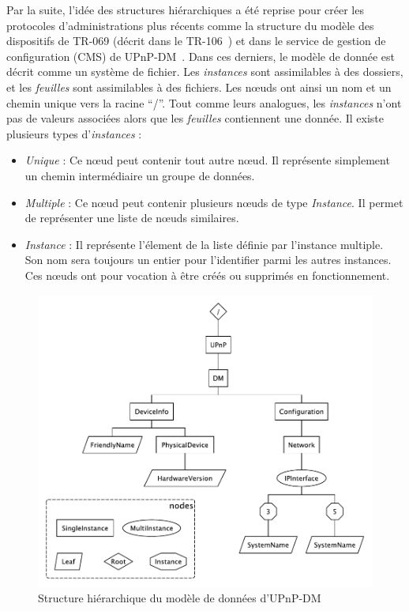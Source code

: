 Par la suite, l'idée des structures hiérarchiques a été reprise pour créer les protocoles d'administrations plus récents comme la structure du modèle des dispositifs de TR-069 (décrit dans le TR-106~\cite{BBF:tr106}) et dans le service de gestion de configuration (CMS) de UPnP-DM~\cite{UPnP:DMCMS}. Dans ces derniers, le modèle de donnée est décrit comme un système de fichier. Les \textit{instances} sont assimilables à des dossiers, et les \textit{feuilles} sont assimilables à des fichiers. Les nœuds ont ainsi un nom et un chemin unique vers la racine \enquote{/}. Tout comme leurs analogues, les \textit{instances} n'ont pas de valeurs associées alors que les \textit{feuilles} contiennent une donnée. Il existe plusieurs types d'\textit{instances} :
\begin{itemize}
    \item \textit{Unique} : Ce nœud peut contenir tout autre nœud. Il représente simplement un chemin intermédiaire un groupe de données.
    \item \textit{Multiple} : Ce nœud peut contenir plusieurs nœuds de type \textit{Instance}. Il permet de représenter une liste de nœuds similaires.
    \item \textit{Instance} : Il représente l'élement de la liste définie par l'instance multiple. Son nom sera toujours un entier pour l'identifier parmi les autres instances. Ces nœuds ont pour vocation à être créés ou supprimés en fonctionnement.
\end{itemize}
\begin{figure}[ht]
    \centering
    \includegraphics[width=.75\textwidth]{fig/rw-supervision-dmtree}
    \caption{Structure hiérarchique du modèle de données d'UPnP-DM}\label{fig:rw:supervision:dmtree}
\end{figure}


